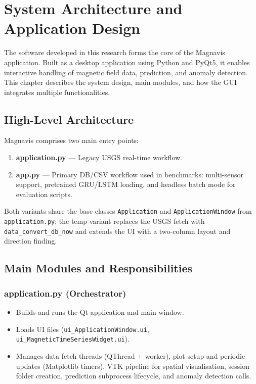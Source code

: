 \chapter{System Architecture and Application Design}
\label{Chapter3}

The software developed in this research forms the core of the Magnavis application. Built as a desktop application using Python and PyQt5, it enables interactive handling of magnetic field data, prediction, and anomaly detection. This chapter describes the system design, main modules, and how the GUI integrates multiple functionalities.

\section{High-Level Architecture}
Magnavis comprises two main entry points:
\begin{enumerate}[label=(\alph*)]
    \item \textbf{application.py} --- Legacy USGS real-time workflow.
    \item \textbf{app.py} --- Primary DB/CSV workflow used in benchmarks: multi-sensor support, pretrained GRU/LSTM loading, and headless batch mode for evaluation scripts.
\end{enumerate}

Both variants share the base classes \texttt{Application} and \texttt{ApplicationWindow} from \texttt{application.py}; the temp variant replaces the USGS fetch with \texttt{data\_convert\_db\_now} and extends the UI with a two-column layout and direction finding.

\section{Main Modules and Responsibilities}

\subsection{application.py (Orchestrator)}
\begin{itemize}
    \item Builds and runs the Qt application and main window.
    \item Loads UI files (\texttt{ui\_ApplicationWindow.ui}, \texttt{ui\_MagneticTimeSeriesWidget.ui}).
    \item Manages data fetch threads (QThread + worker), plot setup and periodic updates (Matplotlib timers), VTK pipeline for spatial visualisation, session folder creation, prediction subprocess lifecycle, and anomaly detection calls.
\end{itemize}

